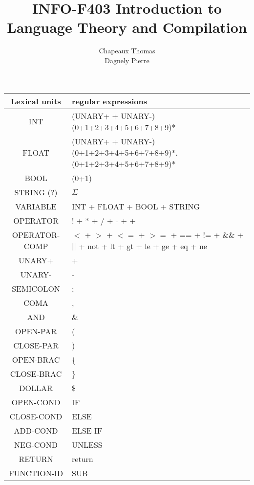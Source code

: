 \documentclass[a4paper,10pt]{article}
\title{INFO-F403 Introduction to Language Theory and Compilation}
\author{Chapeaux Thomas\\Dagnely Pierre}
\begin{document}
\maketitle


\pagebreak

\hspace{-4.5cm}\begin{tabular}{|c|l|}
\hline
Lexical units  		& regular expressions \\ \hline
INT					& (UNARY+ + UNARY-)(0+1+2+3+4+5+6+7+8+9)* \\ \hline
FLOAT				& (UNARY+ + UNARY-)(0+1+2+3+4+5+6+7+8+9)*.(0+1+2+3+4+5+6+7+8+9)* \\ \hline
BOOL				& (0+1) \\ \hline
STRING (?)			& $\Sigma$  \\ \hline
VARIABLE			& INT + FLOAT + BOOL + STRING \\ \hline
OPERATOR			& ! + * + / + - $+$ + \\ \hline
OPERATOR-COMP		& $<$ + $>$ + $<=$ + $>=$ + == + != + \&\& + $||$ + not + lt + gt + le + ge + eq + ne \\ \hline
UNARY+				& + \\ \hline
UNARY-				& - \\ \hline
SEMICOLON			& ; \\ \hline
COMA				& , \\ \hline
AND					& \& \\ \hline
OPEN-PAR			& ( \\ \hline
CLOSE-PAR			& ) \\ \hline
OPEN-BRAC			& \{ \\ \hline
CLOSE-BRAC			& \} \\ \hline
DOLLAR				& \$ \\ \hline
OPEN-COND			& IF \\ \hline
CLOSE-COND 			& ELSE \\ \hline
ADD-COND			& ELSE IF \\ \hline
NEG-COND			& UNLESS \\ \hline
RETURN				& return \\ \hline
FUNCTION-ID			& SUB \\ \hline \hline




\end{tabular}
\end{document}
